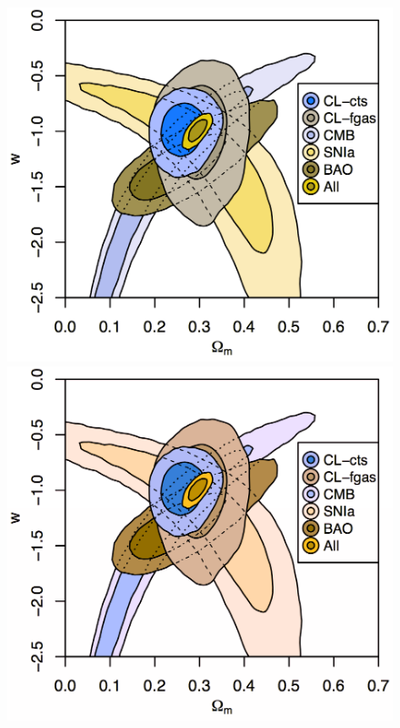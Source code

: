\documentclass[letterpaper,11pt]{article}
\begin{document}
\begin{figure} 
 \includegraphics[scale=0.18]{figures/color_contours_deut}
 \includegraphics[scale=0.18]{figures/color_contours_prot}

\end{figure}
\end{document}
